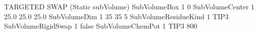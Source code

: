 \documentclass[letterpaper,10pt,english]{sphinxmanual}
\begin{document}
\begin{sphinxVerbatim}[commandchars=\\\{\}]
\PYGZsh{}\PYGZsh{}\PYGZsh{}\PYGZsh{}\PYGZsh{}\PYGZsh{}\PYGZsh{}\PYGZsh{}\PYGZsh{}\PYGZsh{}\PYGZsh{}\PYGZsh{}\PYGZsh{}\PYGZsh{}\PYGZsh{}\PYGZsh{}\PYGZsh{}\PYGZsh{}\PYGZsh{}\PYGZsh{}\PYGZsh{}\PYGZsh{}\PYGZsh{}\PYGZsh{}\PYGZsh{}\PYGZsh{}\PYGZsh{}\PYGZsh{}\PYGZsh{}\PYGZsh{}\PYGZsh{}\PYGZsh{}\PYGZsh{}\PYGZsh{}\PYGZsh{}\PYGZsh{}\PYGZsh{}\PYGZsh{}\PYGZsh{}\PYGZsh{}\PYGZsh{}\PYGZsh{}\PYGZsh{}\PYGZsh{}\PYGZsh{}\PYGZsh{}\PYGZsh{}\PYGZsh{}\PYGZsh{}\PYGZsh{}\PYGZsh{}\PYGZsh{}\PYGZsh{}\PYGZsh{}\PYGZsh{}\PYGZsh{}\PYGZsh{}\PYGZsh{}\PYGZsh{}\PYGZsh{}\PYGZsh{}\PYGZsh{}\PYGZsh{}\PYGZsh{}\PYGZsh{}\PYGZsh{}\PYGZsh{}\PYGZsh{}\PYGZsh{}\PYGZsh{}
\PYGZsh{} TARGETED SWAP (Static subVolume)
\PYGZsh{}\PYGZsh{}\PYGZsh{}\PYGZsh{}\PYGZsh{}\PYGZsh{}\PYGZsh{}\PYGZsh{}\PYGZsh{}\PYGZsh{}\PYGZsh{}\PYGZsh{}\PYGZsh{}\PYGZsh{}\PYGZsh{}\PYGZsh{}\PYGZsh{}\PYGZsh{}\PYGZsh{}\PYGZsh{}\PYGZsh{}\PYGZsh{}\PYGZsh{}\PYGZsh{}\PYGZsh{}\PYGZsh{}\PYGZsh{}\PYGZsh{}\PYGZsh{}\PYGZsh{}\PYGZsh{}\PYGZsh{}\PYGZsh{}\PYGZsh{}\PYGZsh{}\PYGZsh{}\PYGZsh{}\PYGZsh{}\PYGZsh{}\PYGZsh{}\PYGZsh{}\PYGZsh{}\PYGZsh{}\PYGZsh{}\PYGZsh{}\PYGZsh{}\PYGZsh{}\PYGZsh{}\PYGZsh{}\PYGZsh{}\PYGZsh{}\PYGZsh{}\PYGZsh{}\PYGZsh{}\PYGZsh{}\PYGZsh{}\PYGZsh{}\PYGZsh{}\PYGZsh{}\PYGZsh{}\PYGZsh{}\PYGZsh{}\PYGZsh{}\PYGZsh{}\PYGZsh{}\PYGZsh{}\PYGZsh{}\PYGZsh{}\PYGZsh{}\PYGZsh{}
SubVolumeBox                  1       0
SubVolumeCenter               1       25.0 25.0 25.0
SubVolumeDim                  1       35 35 5
SubVolumeResidueKind          1       TIP3
SubVolumeRigidSwap            1       false
SubVolumeChemPot              1       TIP3    \PYGZhy{}800
\end{sphinxVerbatim}
\end{document}
